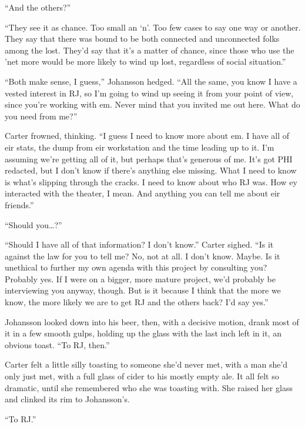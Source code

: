 ``And the others?''

``They see it as chance. Too small an `n'. Too few cases to say one way or another. They say that there was bound to be both connected and unconnected folks among the lost. They'd say that it's a matter of chance, since those who use the 'net more would be more likely to wind up lost, regardless of social situation.''

``Both make sense, I guess,'' Johansson hedged. ``All the same, you know I have a vested interest in RJ, so I'm going to wind up seeing it from your point of view, since you're working with em. Never mind that you invited me out here. What do you need from me?''

Carter frowned, thinking. ``I guess I need to know more about em. I have all of eir stats, the dump from eir workstation and the time leading up to it. I'm assuming we're getting all of it, but perhaps that's generous of me. It's got PHI redacted, but I don't know if there's anything else missing. What I need to know is what's slipping through the cracks. I need to know about who RJ was. How ey interacted with the theater, I mean. And anything you can tell me about eir friends.''

``Should you\ldots{}?''

``Should I have all of that information? I don't know.'' Carter sighed. ``Is it against the law for you to tell me? No, not at all. I don't know. Maybe. Is it unethical to further my own agenda with this project by consulting you? Probably yes. If I were on a bigger, more mature project, we'd probably be interviewing you anyway, though. But is it because I think that the more we know, the more likely we are to get RJ and the others back? I'd say yes.''

Johansson looked down into his beer, then, with a decisive motion, drank most of it in a few smooth gulps, holding up the glass with the last inch left in it, an obvious toast. ``To RJ, then.''

Carter felt a little silly toasting to someone she'd never met, with a man she'd only just met, with a full glass of cider to his mostly empty ale. It all felt so dramatic, until she remembered who she was toasting with. She raised her glass and clinked its rim to Johansson's.

``To RJ.''
